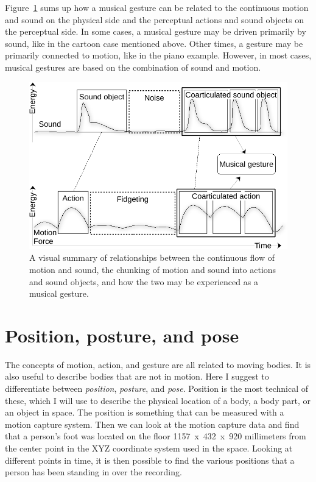 Figure~\ref{fig:gesture} sums up how a musical gesture can be related to the continuous motion and sound on the physical side and the perceptual actions and sound objects on the perceptual side. In some cases, a musical gesture may be driven primarily by sound, like in the cartoon case mentioned above. Other times, a gesture may be primarily connected to motion, like in the piano example. However, in most cases, musical gestures are based on the combination of sound and motion.

\begin{figure}[tbp]
			\includegraphics[width=\columnwidth]{figures/24-musical-gesture-crop.pdf}
			\caption{A visual summary of relationships between the continuous flow of motion and sound, the chunking of motion and sound into actions and sound objects, and how the two may be experienced as a musical gesture.}
			\label{fig:gesture}
\end{figure}


\section{Position, posture, and pose}

The concepts of motion, action, and gesture are all related to moving bodies. It is also useful to describe bodies that are not in motion. Here I suggest to differentiate between \emph{position}, \emph{posture}, and \emph{pose}. Position is the most technical of these, which I will use to describe the physical location of a body, a body part, or an object in space. The position is something that can be measured with a motion capture system. Then we can look at the motion capture data and find that a person's foot was located on the floor 1157~x~432~x~920 millimeters from the center point in the XYZ coordinate system used in the space. Looking at different points in time, it is then possible to find the various positions that a person has been standing in over the recording.

